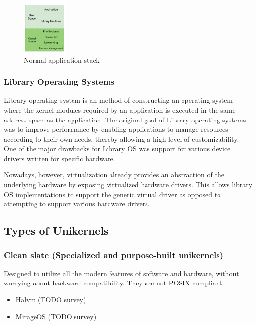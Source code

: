   \begin{figure}[htbp!] 
    \centering    
    \includegraphics[width=0.2\textwidth]{normal_application_stack}
    \caption[Normal]{Normal application stack}
    \label{fig:normal_application_stack}
    \end{figure}

\subsubsection{Library Operating Systems}
Library operating system is an method of constructing an operating system where the kernel modules  
required by an application is executed in the same address space as the application. The original goal 
of Library operating systems was to improve performance by enabling applications to manage resources according to 
their own needs, thereby allowing a high level of customizability. One of the major drawbacks for 
Library OS was support for various device drivers written for specific hardware. 

Nowadays, however, virtualization already provides an abstraction of the underlying hardware by exposing 
virtualized hardware drivers. This allows library OS implementations to support the generic virtual driver 
as opposed to attempting to support various hardware drivers.



\subsection{Types of Unikernels}
\subsubsection{Clean slate (Specialized and purpose-built unikernels)}
Designed to utilize all the modern features of software and hardware, without worrying about backward
compatibility. They are not POSIX-compliant. 
\begin{itemize}
  \item Halvm (TODO survey)
  \item MirageOS (TODO survey)
\end{itemize}

